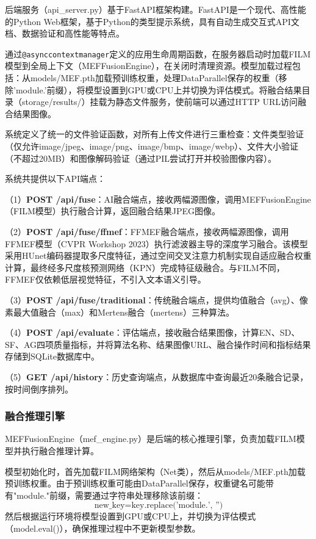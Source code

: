 后端服务（api\_server.py）基于FastAPI框架构建。FastAPI是一个现代、高性能的Python Web框架，基于Python的类型提示系统，具有自动生成交互式API文档、数据验证和高性能等特点。

通过\texttt{@asynccontextmanager}定义的应用生命周期函数，在服务器启动时加载FILM模型到全局上下文（MEFFusionEngine），在关闭时清理资源。模型加载过程包括：从models/MEF.pth加载预训练权重，处理DataParallel保存的权重（移除'module.'前缀），将模型设置到GPU或CPU上并切换为评估模式。将融合结果目录（storage/results/）挂载为静态文件服务，使前端可以通过HTTP URL访问融合结果图像。

系统定义了统一的文件验证函数，对所有上传文件进行三重检查：文件类型验证（仅允许image/jpeg、image/png、image/bmp、image/webp）、文件大小验证（不超过20MB）和图像解码验证（通过PIL尝试打开并校验图像内容）。

系统共提供以下API端点：

（1）\textbf{POST /api/fuse}：AI融合端点，接收两幅源图像，调用MEFFusionEngine（FILM模型）执行融合计算，返回融合结果JPEG图像。

（2）\textbf{POST /api/fuse/ffmef}：FFMEF融合端点，接收两幅源图像，调用FFMEF模型（CVPR Workshop 2023）执行滤波器主导的深度学习融合。该模型采用HUnet编码器提取多尺度特征，通过空间交叉注意力机制实现自适应融合权重计算，最终经多尺度核预测网络（KPN）完成特征级融合。与FILM不同，FFMEF仅依赖低层视觉特征，不引入文本语义引导。

（3）\textbf{POST /api/fuse/traditional}：传统融合端点，提供均值融合（avg）、像素最大值融合（max）和Mertens融合（mertens）三种算法。

（4）\textbf{POST /api/evaluate}：评估端点，接收融合结果图像，计算EN、SD、SF、AG四项质量指标，并将算法名称、结果图像URL、融合操作时间和指标结果存储到SQLite数据库中。

（5）\textbf{GET /api/history}：历史查询端点，从数据库中查询最近20条融合记录，按时间倒序排列。

\subsubsection{融合推理引擎}\label{sec:inference_engine}

MEFFusionEngine（mef\_engine.py）是后端的核心推理引擎，负责加载FILM模型并执行融合推理计算。

模型初始化时，首先加载FILM网络架构（Net类），然后从models/MEF.pth加载预训练权重。由于预训练权重可能由DataParallel保存，权重键名可能带有"module."前缀，需要通过字符串处理移除该前缀：
\begin{equation}
    \text{new\_key} = \text{key.replace('module.', '')}
\end{equation}
然后根据运行环境将模型设置到GPU或CPU上，并切换为评估模式（model.eval()），确保推理过程中不更新模型参数。

